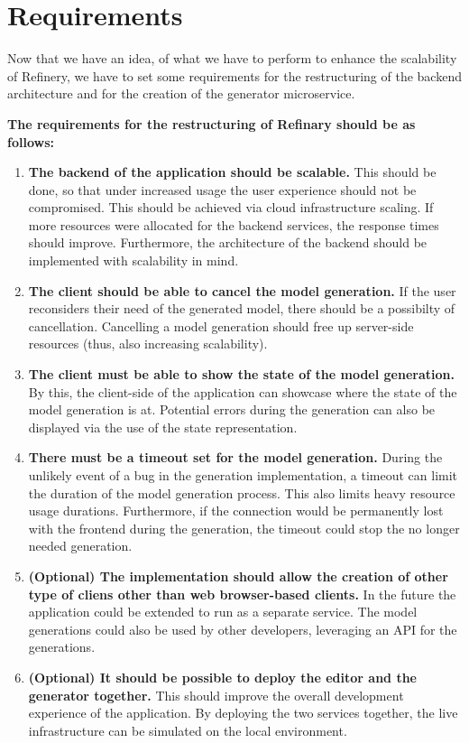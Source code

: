 \section{Requirements} \label{requirements}
Now that we have an idea, of what we have to perform to enhance the scalability of Refinery, we have to set some requirements for the
restructuring of the backend architecture and for the creation of the generator microservice. 

\textbf{The requirements for the restructuring of Refinary should be as follows:}
\begin{enumerate}
        \item \label{requirementscale} \textbf{The backend of the application should be scalable.} This should be done, so that under increased usage 
		the user experience should not be compromised. This should be achieved via cloud infrastructure scaling.
		If more resources were allocated for the backend services, the response times should improve. Furthermore, the
		architecture of the backend should be implemented with scalability in mind.
        \item \label{requirementcancel} \textbf{The client should be able to cancel the model generation.} If the user reconsiders their need of the 
		generated model, there should be a possibilty of cancellation. Cancelling a model generation should 
		free up server-side resources (thus, also increasing scalability).
		\item \label{requirementstate} \textbf{The client must be able to show the state of the model generation.} By this, the client-side of the application can showcase
        where the state of the model generation is at. Potential errors during the generation can also be displayed via the use of the state representation.
        \item \label{requirementtimeout} \textbf{There must be a timeout set for the model generation.} During the unlikely event of a bug in the generation implementation, 
		a timeout can limit the duration of the model generation process. This also limits heavy resource usage durations. Furthermore, if the connection would be 
		permanently lost with the frontend during the generation, the timeout could stop the no longer needed generation.
		\item \label{requirementseparateclient} \textbf{(Optional) The implementation should allow the creation of other type of cliens other than web browser-based clients.} In the future
		the application could be extended to run as a separate service. The model generations could also be used by other developers, leveraging an API for the
		generations.
		\item \label{requirementdeployment} \textbf{(Optional) It should be possible to deploy the editor and the generator together.} 
		This should improve the overall development experience of the application.
		By deploying the two services together, the live infrastructure can be simulated on the local environment.
\end{enumerate}

